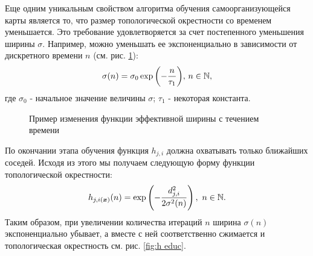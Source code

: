 \documentclass[a4paper,12pt]{report}
\begin{document}
Еще одним уникальным свойством алгоритма обучения самоорганизующейся
карты является то, что размер топологической окрестности со временем
уменьшается. Это требование удовлетворяется за счет постепенного
уменьшения ширины $\sigma$. Например, можно уменьшать ее
экспоненциально в зависимости от дискретного времени $n$ (см. рис.
\ref{fig:effective width 2}):
\begin{equation}
    \sigma(n) = \sigma_0\exp{\left( - \frac{n}{\tau_1}\right)},\, n
    \in \mathbb{N},
\end{equation}
где $\sigma_0$ - начальное значение величины $\sigma$; $\tau_1$ -
некоторая константа.

\begin{figure}
    \centering
    \caption{Пример изменения функции эффективной ширины с течением
    времени}
    \label{fig:effective width 2}
\end{figure}

По окончании этапа обучения функция $h_{j,i}$ должна охватывать только
ближайших соседей. Исходя из этого мы получаем следующую форму функции
топологической окрестности:
\begin{equation}
    h_{j,i(\boldsymbol{x})}(n) = \exp\left( -\frac{d_{j,i}^{2}}{2\sigma^2(n)} \right),\ n \in \mathbb{N}.
\end{equation}
Таким образом, при увеличении количества итераций $n$ ширина
$\sigma(n)$ экспоненциально убывает, а вместе с ней соответственно
сжимается и топологическая окрестность см. рис. \ref{fig:h educ}.
\end{document}
